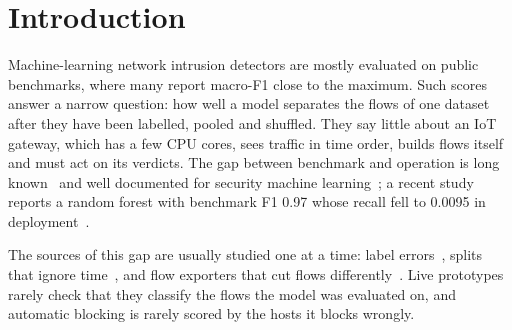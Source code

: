 \section{Introduction}\label{sec:intro}

Machine-learning network intrusion detectors are mostly evaluated on public benchmarks, where many report macro-F1 close to the maximum. Such scores answer a narrow question: how well a model separates the flows of one dataset after they have been labelled, pooled and shuffled. They say little about an IoT gateway, which has a few CPU cores, sees traffic in time order, builds flows itself and must act on its verdicts. The gap between benchmark and operation is long known~\cite{sommer2010outside} and well documented for security machine learning~\cite{arp2022dos,apruzzese2023sok}; a recent study reports a random forest with benchmark F1 0.97 whose recall fell to 0.0095 in deployment~\cite{tang2026hybrid}.

The sources of this gap are usually studied one at a time: label errors~\cite{engelen2021troubleshooting,liu2022error,flood2024smells}, splits that ignore time~\cite{pendlebury2019tesseract,arp2022dos}, and flow exporters that cut flows differently~\cite{pinto2025hera,vitorino2025revisiting}. Live prototypes rarely check that they classify the flows the model was evaluated on, and automatic blocking is rarely scored by the hosts it blocks wrongly.

